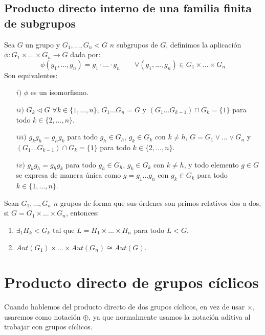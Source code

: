 \subsection{Producto directo interno de una familia finita de subgrupos}
\begin{teo}\label{teo:prod_dir_int_fam}
    Sea $G$ un grupo y $G_1,\ldots,G_n < G$ $n$ subgrupos de $G$, definimos la aplicación $\phi:G_1\times \ldots \times G_n\to G$ dada por:
    \begin{equation*}
        \phi(g_1,\ldots,g_n) = g_1\cdot \ldots \cdot g_n \qquad \forall (g_1,\ldots,g_n)\in G_1\times \ldots \times G_n
    \end{equation*}
    Son equivalentes:
    \begin{enumerate}
        \item[$i)$] $\phi$ es un isomorfismo.
        \item[$ii)$] $G_k\lhd G$ $\forall k\in \{1,\ldots,n\}$, $G_1\ldots G_n = G$ y $(G_1 \ldots G_{k-1}) \cap G_k = \{1\}$ para todo $k\in \{2,\ldots,n\}$.
        \item[$iii)$] $g_k g_h = g_h g_k$ para todo $g_h\in G_h$, $g_k\in G_k$ con $k\neq h$, $G = G_1\lor \ldots \lor G_n$ y $(G_1 \ldots G_{k-1}) \cap G_k = \{1\}$ para todo $k\in \{2,\ldots,n\}$.
        \item[$iv)$] $g_k g_h = g_h g_k$ para todo $g_h\in G_h$, $g_k\in G_k$ con $k\neq h$, y todo elemento $g\in G$ se expresa de manera única como $g= g_1\ldots g_n$ con $g_k \in G_k$ para todo $k \in \{1,\ldots,n\}$.
    \end{enumerate}
\end{teo}

\begin{teo}
    Sean $G_1,\ldots,G_n$ $n$ grupos de forma que sus órdenes son primos relativos dos a dos, si $G = G_1 \times \ldots \times G_n$, entonces:
    \begin{enumerate}
        \item $\exists_1 H_k < G_k$ tal que $L = H_1\times \ldots \times H_n$ para todo $L<G$.
        \item $Aut(G_1)\times \ldots \times Aut(G_n)\cong Aut(G)$.
    \end{enumerate}
\end{teo}

\section{Producto directo de grupos cíclicos}
\begin{notacion}
    Cuando hablemos del producto directo de dos grupos cíclicos, en vez de usar $\times$, usaremos como notación $\oplus$, ya que normalmente usamos la notación aditiva al trabajar con grupos cíclicos.
\end{notacion}

